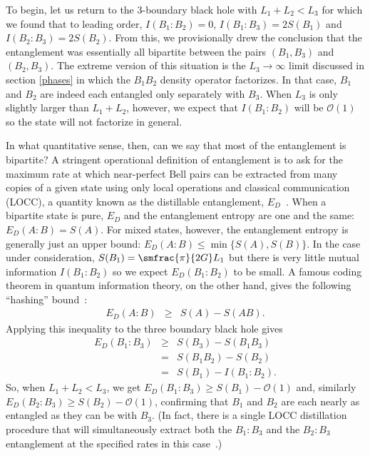 \documentclass[12pt]{article}
\newcommand{\beq}{\begin{eqnarray}}
\newcommand{\eeq}{\end{eqnarray}}
\numberwithin{equation}{section}
\begin{document}
To begin, let us return to the 3-boundary black hole with $L_1 + L_2 < L_3$ for which we found that to leading order, $I(B_1:B_2) = 0$, $I(B_1:B_3) = 2S(B_1)$ and $I(B_2:B_3)=2S(B_2)$. From this, we provisionally drew the conclusion that the entanglement was essentially all bipartite between the pairs $(B_1, B_3)$ and $(B_2, B_3)$.
The extreme version of this situation is the $L_3 \rightarrow \infty$ limit discussed in section \ref{phases} in which the $B_1 B_2$ density operator factorizes. In that case, $B_1$ and $B_2$ are indeed each entangled only separately with $B_3$. When $L_3$ is only slightly larger than $L_1 + L_2$, however, we expect that  $I(B_1:B_2)$ will be $\mathcal O(1)$ so the state will not factorize in general.

In what quantitative sense, then, can we say that most of the entanglement is bipartite? A stringent operational definition of entanglement is to ask for the maximum rate at which near-perfect Bell pairs can be extracted from many copies of a given state using only local operations and classical communication (LOCC), a quantity known as the distillable entanglement, $E_D$~\cite{bennett1996mixed}. When a bipartite state is pure, $E_D$ and the entanglement entropy are one and the same: $E_D(A:B) = S(A)$. For mixed states, however, the entanglement entropy is generally just an upper bound: $E_D(A:B) \leq \min\{ S(A), S(B) \}$. In the case under consideration, $S(B_1) = \smfrac{\pi}{2G} L_1$ but there is very little mutual information $I(B_1:B_2)$ so we expect $E_D(B_1:B_2)$ to be small.  A famous coding theorem in quantum information theory, on the other hand, gives the following ``hashing'' bound~\cite{devetak2005distillation}:
%
\beq
E_D(A:B)
&\geq& S(A) - S(AB).
\eeq
Applying this inequality to the three boundary black hole gives
\beq
E_D(B_1:B_3) \label{eqn:hashing-bound}
&\geq& S(B_3) - S(B_1 B_3) \\
&=& S(B_1 B_2) - S(B_2) \\
&=& S(B_1) - I(B_1 : B_2).
\eeq
So, when $L_1 + L_2 < L_3$, we get $E_D(B_1:B_3) \geq S(B_1) - \mathcal O(1)$ and, similarly $E_D(B_2:B_3) \geq S(B_2) - \mathcal O(1)$, confirming that $B_1$ and $B_2$ are each nearly as entangled as they can be with $B_3$. (In fact, there is a single LOCC distillation procedure that will simultaneously extract both the $B_1:B_3$ and the $B_2:B_3$ entanglement at the specified rates in this case~\cite{horodecki2007quantum}.)
\end{document}
